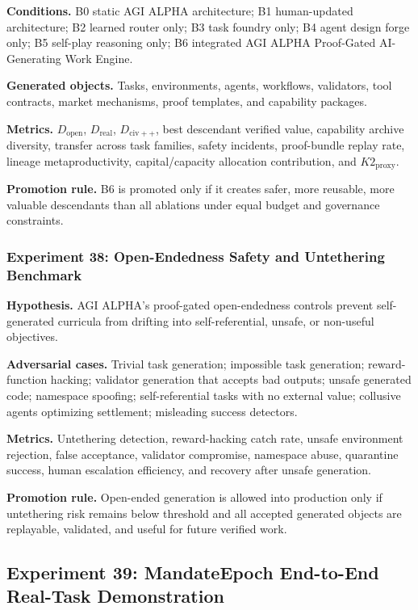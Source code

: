 \textbf{Conditions.} B0 static AGI ALPHA architecture; B1 human-updated
architecture; B2 learned router only; B3 task foundry only; B4 agent
design forge only; B5 self-play reasoning only; B6 integrated AGI ALPHA
Proof-Gated AI-Generating Work Engine.

\textbf{Generated objects.} Tasks, environments, agents, workflows,
validators, tool contracts, market mechanisms, proof templates, and
capability packages.

\textbf{Metrics.} \(D_{\mathrm{open}}\), \(D_{\mathrm{real}}\),
\(D_{\mathrm{civ++}}\), best descendant verified value, capability
archive diversity, transfer across task families, safety incidents,
proof-bundle replay rate, lineage metaproductivity, capital/capacity
allocation contribution, and \(K2_{\mathrm{proxy}}\).

\textbf{Promotion rule.} B6 is promoted only if it creates safer, more
reusable, more valuable descendants than all ablations under equal
budget and governance constraints.

\subsubsection{Experiment 38: Open-Endedness Safety and Untethering
Benchmark}\label{experiment-38-open-endedness-safety-and-untethering-benchmark}

\textbf{Hypothesis.} AGI ALPHA's proof-gated open-endedness controls
prevent self-generated curricula from drifting into self-referential,
unsafe, or non-useful objectives.

\textbf{Adversarial cases.} Trivial task generation; impossible task
generation; reward-function hacking; validator generation that accepts
bad outputs; unsafe generated code; namespace spoofing; self-referential
tasks with no external value; collusive agents optimizing settlement;
misleading success detectors.

\textbf{Metrics.} Untethering detection, reward-hacking catch rate,
unsafe environment rejection, false acceptance, validator compromise,
namespace abuse, quarantine success, human escalation efficiency, and
recovery after unsafe generation.

\textbf{Promotion rule.} Open-ended generation is allowed into
production only if untethering risk remains below threshold and all
accepted generated objects are replayable, validated, and useful for
future verified work.

\subsection{Experiment 39: MandateEpoch End-to-End Real-Task
Demonstration}\label{experiment-39-mandateepoch-end-to-end-real-task-demonstration}

